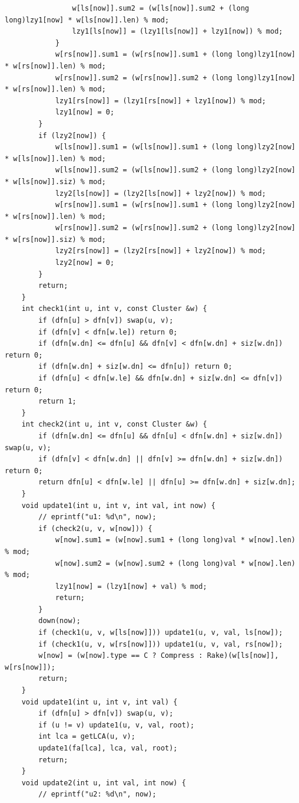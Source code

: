 \begin{verbatim}
                w[ls[now]].sum2 = (w[ls[now]].sum2 + (long long)lzy1[now] * w[ls[now]].len) % mod;
                lzy1[ls[now]] = (lzy1[ls[now]] + lzy1[now]) % mod;
            }
            w[rs[now]].sum1 = (w[rs[now]].sum1 + (long long)lzy1[now] * w[rs[now]].len) % mod;
            w[rs[now]].sum2 = (w[rs[now]].sum2 + (long long)lzy1[now] * w[rs[now]].len) % mod;
            lzy1[rs[now]] = (lzy1[rs[now]] + lzy1[now]) % mod;
            lzy1[now] = 0;
        }
        if (lzy2[now]) {
            w[ls[now]].sum1 = (w[ls[now]].sum1 + (long long)lzy2[now] * w[ls[now]].len) % mod;
            w[ls[now]].sum2 = (w[ls[now]].sum2 + (long long)lzy2[now] * w[ls[now]].siz) % mod;
            lzy2[ls[now]] = (lzy2[ls[now]] + lzy2[now]) % mod;
            w[rs[now]].sum1 = (w[rs[now]].sum1 + (long long)lzy2[now] * w[rs[now]].len) % mod;
            w[rs[now]].sum2 = (w[rs[now]].sum2 + (long long)lzy2[now] * w[rs[now]].siz) % mod;
            lzy2[rs[now]] = (lzy2[rs[now]] + lzy2[now]) % mod;
            lzy2[now] = 0;
        }
        return;
    }
    int check1(int u, int v, const Cluster &w) {
        if (dfn[u] > dfn[v]) swap(u, v);
        if (dfn[v] < dfn[w.le]) return 0;
        if (dfn[w.dn] <= dfn[u] && dfn[v] < dfn[w.dn] + siz[w.dn]) return 0;
        if (dfn[w.dn] + siz[w.dn] <= dfn[u]) return 0;
        if (dfn[u] < dfn[w.le] && dfn[w.dn] + siz[w.dn] <= dfn[v]) return 0;
        return 1;
    }
    int check2(int u, int v, const Cluster &w) {
        if (dfn[w.dn] <= dfn[u] && dfn[u] < dfn[w.dn] + siz[w.dn]) swap(u, v);
        if (dfn[v] < dfn[w.dn] || dfn[v] >= dfn[w.dn] + siz[w.dn]) return 0;
        return dfn[u] < dfn[w.le] || dfn[u] >= dfn[w.dn] + siz[w.dn];
    }
    void update1(int u, int v, int val, int now) {
        // eprintf("u1: %d\n", now);
        if (check2(u, v, w[now])) {
            w[now].sum1 = (w[now].sum1 + (long long)val * w[now].len) % mod;
            w[now].sum2 = (w[now].sum2 + (long long)val * w[now].len) % mod;
            lzy1[now] = (lzy1[now] + val) % mod;
            return;
        }
        down(now);
        if (check1(u, v, w[ls[now]])) update1(u, v, val, ls[now]);
        if (check1(u, v, w[rs[now]])) update1(u, v, val, rs[now]);
        w[now] = (w[now].type == C ? Compress : Rake)(w[ls[now]], w[rs[now]]);
        return;
    }
    void update1(int u, int v, int val) {
        if (dfn[u] > dfn[v]) swap(u, v);
        if (u != v) update1(u, v, val, root);
        int lca = getLCA(u, v);
        update1(fa[lca], lca, val, root);
        return;
    }
    void update2(int u, int val, int now) {
        // eprintf("u2: %d\n", now);

\end{verbatim}
